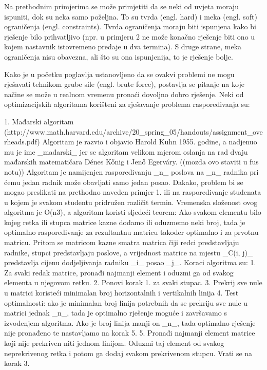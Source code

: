 Na prethodnim primjerima se može primjetiti da se neki od uvjeta moraju ispuniti, dok su neka samo poželjna. To su tvrda
(engl. hard) i meka (engl. soft) ograničenja (engl. constraints). Tvrda ograničenja moraju biti ispunjena kako bi rješenje bilo
prihvatljivo (npr. u primjeru 2 ne može konačno rješenje biti ono u kojem nastavnik istovremeno predaje u dva termina). S druge strane,
meka ograničenja nisu obavezna, ali što su ona ispunjenija, to je rješenje bolje.

Kako je u početku poglavlja ustanovljeno da se ovakvi problemi ne mogu rješavati tehnikom grube sile (engl. brute force), postavlja
se pitanje na koje načine se može u realnom vremenu pronaći dovoljno dobro rješenje. Neki od optimizacijskih algoritama korišteni
za rješavanje problema raspoređivanja su:

1. Mađarski algoritam (http://www.math.harvard.edu/archive/20_spring_05/handouts/assignment_overheads.pdf)
Algoritam je razvio i objavio Harold Kuhn 1955. godine, a nadjenuo mu je ime _mađarski_ jer se algoritam velikom mjerom oslanja
na rad dvaju mađarskih matematičara Dénes Kőnig i Jenő Egerváry. ((mozda ovo staviti u fus notu))
Algoritam je namijenjen raspoređivanju _n_ poslova na _n_ radnika pri ćemu jedan radnik može obavljati samo jedan posao. Dakako,
problem bi se mogao preslikati na prethodno naveden primjer 1. ili na raspoređivanje studenata u kojem je svakom studentu pridružen
različit termin. Vremenska složenost ovog algoritma je O(n3), a algoritam koristi sljedeći teorem:
Ako svakom elementu bilo kojeg retka ili stupca matrice kazne dodamo ili oduzmemo neki broj, tada je optimalno raspoređivanje za rezultantnu
matricu također optimalno i za prvotnu matricu. Pritom se matricom kazne smatra matrica čiji redci predstavljaju radnike, stupci predstavljaju
poslove, a vrijednost matrice na mjestu _C(i, j)_ predstavlja cijenu dodjeljivanja radniku _i_ posao _j_.
Koraci algoritma su:
1. Za svaki redak matrice, pronađi najmanji element i oduzmi ga od svakog elementa u njegovom retku.
2. Ponovi korak 1. za svaki stupac.
3. Prekrij sve nule u matrici koristeći minimalan broj horizontalnih i vertikalnih linija
4. Test optimalnosti: ako je minimalan broj linija potrebnih da se prekriju sve nule u matrici jednak _n_, tada je optimalno rješenje moguće
i završavamo s izvođenjem algoritma. Ako je broj linija manji on _n_, tada optimalno rješenje nije pronađeno te nastavljamo na korak 5.
5. Pronađi najmanji element matrice koji nije prekriven niti jednom linijom. Oduzmi taj element od svakog neprekrivenog retka i potom
ga dodaj svakom prekrivenom stupcu. Vrati se na korak 3.


